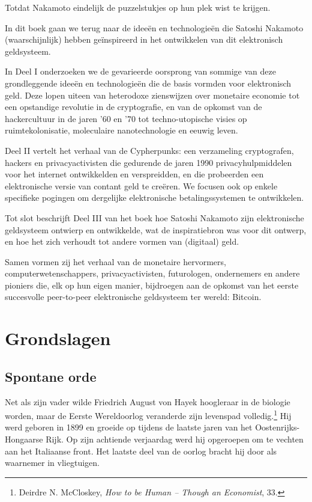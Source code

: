 \documentclass[
  a5paper,
  smalldemyvopaper,11pt,twoside,onecolumn,openright,extrafontsizes,
hidelinks]{memoir}
\begin{document}
Totdat Nakamoto eindelijk de puzzelstukjes op hun plek wist te krijgen.

In dit boek gaan we terug naar de ideeën en technologieën die Satoshi
Nakamoto (waarschijnlijk) hebben geïnspireerd in het ontwikkelen van dit
elektronisch geldsysteem.

In Deel I onderzoeken we de gevarieerde oorsprong van sommige van deze
grondleggende ideeën en technologieën die de basis vormden voor
elektronisch geld. Deze lopen uiteen van heterodoxe zienswijzen over
monetaire economie tot een opstandige revolutie in de cryptografie, en
van de opkomst van de hackercultuur in de jaren '60 en '70 tot
techno-utopische visies op ruimtekolonisatie, moleculaire
nanotechnologie en eeuwig leven.

Deel II vertelt het verhaal van de Cypherpunks: een verzameling
cryptografen, hackers en privacyactivisten die gedurende de jaren 1990
privacyhulpmiddelen voor het internet ontwikkelden en verspreidden, en
die probeerden een elektronische versie van contant geld te creëren. We
focusen ook op enkele specifieke pogingen om dergelijke elektronische
betalingssystemen te ontwikkelen.

Tot slot beschrijft Deel III van het boek hoe Satoshi Nakamoto zijn
elektronische geldsysteem ontwierp en ontwikkelde, wat de inspiratiebron
was voor dit ontwerp, en hoe het zich verhoudt tot andere vormen van
(digitaal) geld.

Samen vormen zij het verhaal van de monetaire hervormers,
computerwetenschappers, privacyactivisten, futurologen, ondernemers en
andere pioniers die, elk op hun eigen manier, bijdroegen aan de opkomst
van het eerste succesvolle peer-to-peer elektronische geldsysteem ter
wereld: Bitcoin.

\part{Grondslagen}

\chapter{Spontane orde}\label{spontane-orde}

Net als zijn vader wilde Friedrich August von Hayek hoogleraar in de
biologie worden, maar de Eerste Wereldoorlog veranderde zijn levenspad
volledig.\footnote{\hspace{0pt}Deirdre N. McCloskey, \emph{How to be
  Human -- Though an Economist}, 33.} Hij werd geboren in 1899 en
groeide op tijdens de laatste jaren van het Oostenrijks-Hongaarse Rijk.
Op zijn achtiende verjaardag werd hij opgeroepen om te vechten aan het
Italiaanse front. Het laatste deel van de oorlog bracht hij door als
waarnemer in vliegtuigen.
\end{document}
